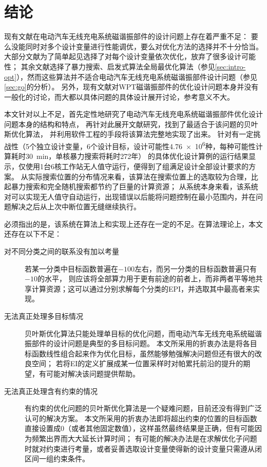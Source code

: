\documentclass[index]{subfiles}
\begin{document}
\chapter{结论}\label{sec:con}
现有文献在电动汽车无线充电系统磁谐振部件的设计问题上存在着严重不足：
要么没能同时对多个设计变量进行性能调优，要么对优化方法的选择并不十分恰当。
大部分文献为了简单起见选择了对每个设计变量依次优化，放弃了很多设计可能性；
其余文献选择了暴力搜索、启发式算法全局最优化算法（参见\cref{sec:intro-opt}），然而这些算法并不适合电动汽车无线充电系统磁谐振部件设计问题（参见\cref{sec:go}的分析）。
另外，现有文献对WPT磁谐振部件的优化设计问题本身并没有一般化的讨论，而大都以具体问题的具体设计展开讨论，参考意义不大。

本文针对以上不足，首先定性地研究了电动汽车无线充电系统磁谐振部件优化设计问题本身的结构和特点，
再针对此展开文献研究，找到了最适合于该问题的贝叶斯优化算法，
并利用软件工程的手段将该算法完整地实现了出来。
针对有一定挑战性（5个独立设计变量，6个设计目标，设计可能性\num{4.76e6}种，每种可能性计算耗时\SI{30}{\minute}，单核暴力搜索将耗时\num{272}年）
的具体优化设计算例的运行结果显示，仅使用1台6核工作站无人值守运行\exmHour{}，便得到了\exmValid{}组满足设计全部设计要求的方案。
从实际搜索位置的分布情况来看，该算法在搜索位置上的选取较为合理，比起暴力搜索和完全随机搜索都节约了巨量的计算资源；
从系统本身来看，该系统对可以实现无人值守自动运行，出现错误以后能将问题控制在最小范围内，并在问题解决之后从上次中断位置无缝继续执行。

必须指出的是，该系统在算法上和实现上还存在一定的不足。在算法理论上，本文还存在以下不足：
\begin{description}
  \item[对不同分类之间的联系没有加以考量] 若某一分类中目标函数普遍在$-100$左右，而另一分类的目标函数普遍只有$-10$的水平，
  则应该将全部算力用于更有前途的前者上，而非两者平等地共享计算资源；这可以通过分别求解每个分类的EPI，并选取其中最高者来实现。
  \item[无法真正处理多目标情况] 贝叶斯优化算法只能处理单目标的优化问题，而电动汽车无线充电系统磁谐振部件的设计问题是典型的多目标问题。
  本文所采用的折衷办法是将各目标函数线性组合起来作为优化目标，虽然能够勉强解决问题但还有很大的改良空间；
  若将EI的定义扩展成某一位置采样时对帕累托前沿的提升的期望，有可能对解决该问题提供帮助。
  \item[无法真正处理含有约束的情况] 有约束的优化问题的贝叶斯优化算法是一个疑难问题，目前还没有得到广泛认可的解决方案。
  本文所采用的折衷办法即将超出约束的位置的目标函数直接设置成0（或者其他固定数值），这样虽然最终结果是正确，但有可能因为频繁出界而大大延长计算时间；
  有可能的解决办法是在求解优化子问题时就对约束进行考量，或者妥善选取设计变量使得新的设计变量只需遵从闭区间一组约束条件。
\end{description}
\end{document}
